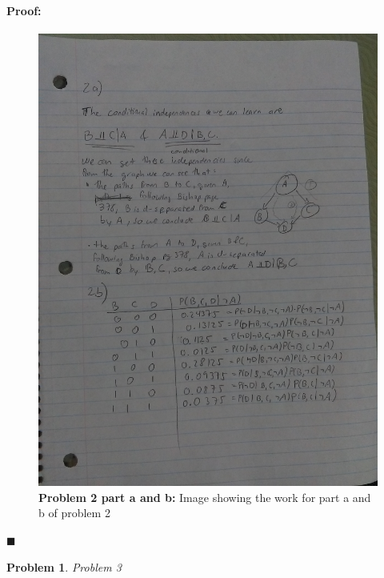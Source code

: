 \documentclass[12pt]{article}
\newenvironment{proof}{\paragraph{Proof: }}{\hfill$\blacksquare$}
\newtheorem{problem}{Problem}%
\begin{document}
\begin{proof}

\begin{figure}[!htbp]
\centering
\includegraphics[width = 13cm]{prob2_hw5.jpg}
\caption{\textbf{Problem 2 part a and b:} Image showing the work for part a and b of problem 2}
\end{figure}

\end{proof}

\newpage
\begin{problem}
\normalfont 
Problem 3
\end{problem}
\end{document}
